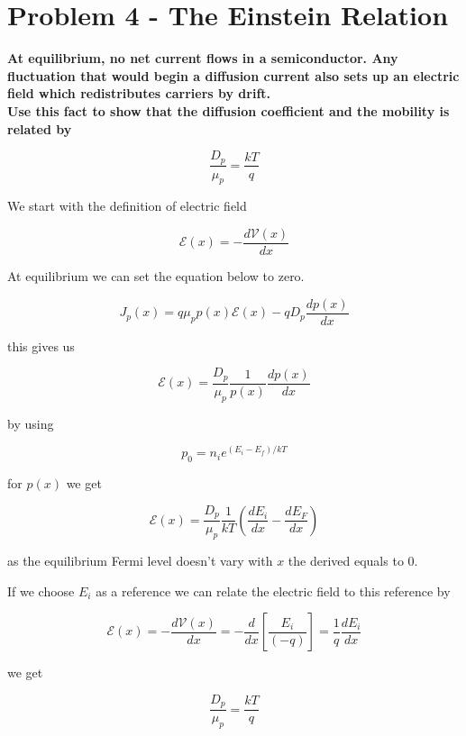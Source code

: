 \section{Problem 4 - The Einstein Relation}
\textbf{At equilibrium, no net current flows in a semiconductor. Any fluctuation that would begin a diffusion current also sets up an electric field which redistributes carriers by drift. \\Use this fact to show that the diffusion coefficient and the mobility is related by}

\begin{equation*}
    \frac{D_p}{\mu_p}=\frac{kT}{q}
\end{equation*}

We start with the  definition of electric field

\begin{equation*}
    \mathscr{E}(x)=-\frac{d\mathscr{V}(x)}{dx}
\end{equation*}

At equilibrium we can set the equation below to zero.

\begin{equation*}
    J_{p}(x)=q \mu_{p} p(x) \mathscr{E}(x)-q D_{p} \frac{d p(x)}{d x}
\end{equation*}

this gives us

\begin{equation*}
    \mathscr{E}(x)=\frac{D_{p}}{\mu_{p}} \frac{1}{p(x)} \frac{d p(x)}{d x}
\end{equation*}

by using

\begin{equation*}
    p_{0}=n_{i} e^{\left(E_{i}-E_{f}\right) / k T}
\end{equation*}

for $p(x)$ we get

\begin{equation*}
    \mathscr{E}(x)=\frac{D_{p}}{\mu_{p}} \frac{1}{k T}\left(\frac{d E_{i}}{d x}-\frac{d E_{F}}{d x}\right)
\end{equation*}

as the equilibrium Fermi level doesn't vary with $x$ the derived equals to 0.

If we choose $E_i$ as a reference we can relate the electric field to this reference by 

\begin{equation*}
    \mathscr{E}(x)=-\frac{d \mathscr{V}(x)}{d x}=-\frac{d}{d x}\left[\frac{E_{i}}{(-q)}\right]=\frac{1}{q} \frac{d E_{i}}{d x}
\end{equation*}

we get 

\begin{equation*}
    \frac{D_p}{\mu_p}=\frac{kT}{q}
\end{equation*}
